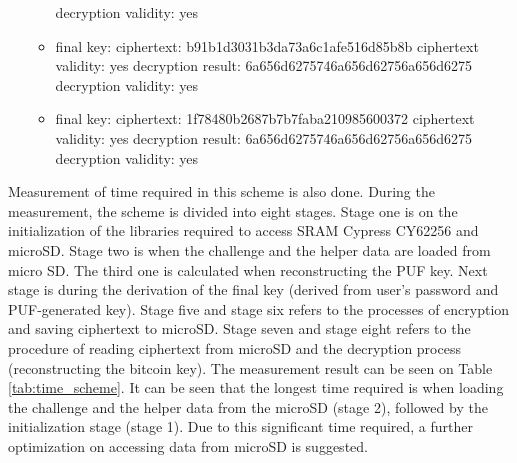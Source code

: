 \begin{itemize}
\begin{itemize}
    decryption validity: yes
    \item final key: \newline
    ciphertext: b91b1d3031b3da73a6c1afe516d85b8b\newline
    ciphertext validity: yes\newline
    decryption result: 6a656d6275746a656d62756a656d6275\newline
    decryption validity: yes
    \item final key: \newline
    ciphertext: 1f78480b2687b7b7faba210985600372\newline
    ciphertext validity: yes\newline
    decryption result: 6a656d6275746a656d62756a656d6275\newline
    decryption validity: yes
  \end{itemize}

\end{itemize}

Measurement of time required in this scheme is also done. During the measurement, the scheme is divided into eight stages. Stage one is on the initialization of the libraries required to access SRAM Cypress CY62256 and microSD. Stage two is when the challenge and the helper data are loaded from micro SD. The third one is calculated when reconstructing the PUF key. Next stage is during the derivation of the final key (derived from user's password and PUF-generated key). Stage five and stage six refers to the processes of encryption and saving ciphertext to microSD. Stage seven and stage eight refers to the procedure of reading ciphertext from microSD and the decryption process (reconstructing the bitcoin key). The measurement result can be seen on Table \ref{tab:time_scheme}. It can be seen that the longest time required is when loading the challenge and the helper data from the microSD (stage 2), followed by the initialization stage (stage 1). Due to this significant time required, a further optimization on accessing data from microSD is suggested.

